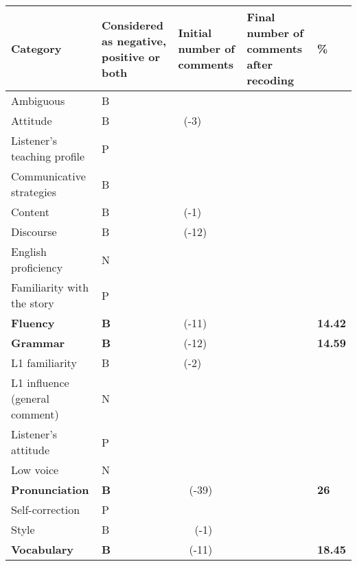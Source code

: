 \documentclass[12pt]{article}
\begin{document}
\begin{center}
\tablehead{}
\begin{supertabular}{m{1.8893598in}m{1.1261599in}m{0.70875984in}m{0.90665984in}m{0.45315984in}}
\hline
\bfseries Category &
\bfseries Considered as negative, positive or both &
\bfseries Initial number of comments &
\bfseries Final number of comments after recoding &
\bfseries \%\\\hline
\mdseries Ambiguous\footnotemark{} &
\mdseries B &
 &
 &
\\
\mdseries Attitude &
\mdseries B &
 \ (-3) &
 &
\\
\mdseries Listener’s teaching profile &
\mdseries P &
 &
 &
\\
\mdseries Communicative strategies &
\mdseries B &
 &
 &
\\
\mdseries Content &
\mdseries B &
 \ (-1) &
 &
\\
\mdseries Discourse &
\mdseries B &
 \ (-12) &
 &
\\
\mdseries English proficiency &
\mdseries N &
 &
 &
\\
\mdseries Familiarity with the story &
\mdseries P &
 &
 &
\\
\mdseries \textbf{Fluency} &
\mdseries \textbf{B} &
 \ (-11) &
 &
\mdseries \textbf{14.42}\\
\mdseries \textbf{Grammar} &
\mdseries \textbf{B} &
 \ (-12) &
 &
\mdseries \textbf{14.59}\\
\mdseries L1 familiarity &
\mdseries B &
 \ (-2) &
 &
\\
\mdseries L1 influence (general comment) &
\mdseries N &
 &
 &
\\
\mdseries Listener’s attitude &
\mdseries P &
 &
 &
\\
\mdseries Low voice &
\mdseries N &
 &
 &
\\
\mdseries \textbf{Pronunciation} &
\mdseries \textbf{B} &
 \ \ (-39) &
 &
\mdseries \textbf{26}\\
\mdseries Self-correction &
\mdseries P &
 &
 &
\\
\mdseries Style &
\mdseries B &
 \ \ \ (-1) &
 &
\\
\mdseries \textbf{Vocabulary} &
\mdseries \textbf{B} &
 \ \ (-11) &
 &
\mdseries \textbf{18.45}\\\hline
\end{supertabular}
\end{center}
\end{document}
